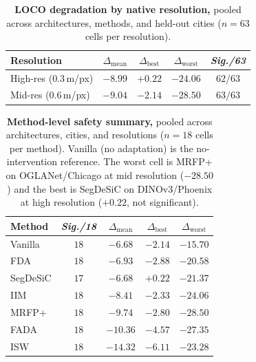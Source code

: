\begin{table}[h]
\centering
\small
\caption{
\textbf{LOCO degradation by native resolution,} pooled across architectures,
methods, and held-out cities ($n = 63$ cells per resolution).
}
\label{tab:loco-per-resolution}
\begin{tabular}{lcccc}
\toprule
\textbf{Resolution} & $\Delta_{\text{mean}}$ & $\Delta_{\text{best}}$ & $\Delta_{\text{worst}}$ & \textit{Sig./63} \\
\midrule
High-res ($0.3$\,m/px) & $-8.99$ & $+0.22$ & $-24.06$ & $62/63$ \\
Mid-res  ($0.6$\,m/px) & $-9.04$ & $-2.14$ & $-28.50$ & $63/63$ \\
\bottomrule
\end{tabular}
\end{table}

\begin{table}[h]
\centering
\small
\caption{
\textbf{Method-level safety summary,} pooled across architectures, cities,
and resolutions ($n = 18$ cells per method). Vanilla (no adaptation) is the
no-intervention reference. The worst cell is MRFP+ on OGLANet/Chicago at mid
resolution ($-28.50$) and the best is SegDeSiC on DINOv3/Phoenix at high
resolution ($+0.22$, not significant).
}
\label{tab:loco-method-summary}
\begin{tabular}{lcccc}
\toprule
\textbf{Method} & \textit{Sig./18} & $\Delta_{\text{mean}}$ & $\Delta_{\text{best}}$ & $\Delta_{\text{worst}}$ \\
\midrule
Vanilla   & $18$ & $-6.68$  & $-2.14$ & $-15.70$ \\
FDA       & $18$ & $-6.93$  & $-2.88$ & $-20.58$ \\
SegDeSiC  & $17$ & $-6.68$  & $+0.22$ & $-21.37$ \\
IIM       & $18$ & $-8.41$  & $-2.33$ & $-24.06$ \\
MRFP+     & $18$ & $-9.74$  & $-2.80$ & $-28.50$ \\
FADA      & $18$ & $-10.36$ & $-4.57$ & $-27.35$ \\
ISW       & $18$ & $-14.32$ & $-6.11$ & $-23.28$ \\
\bottomrule
\end{tabular}
\end{table}